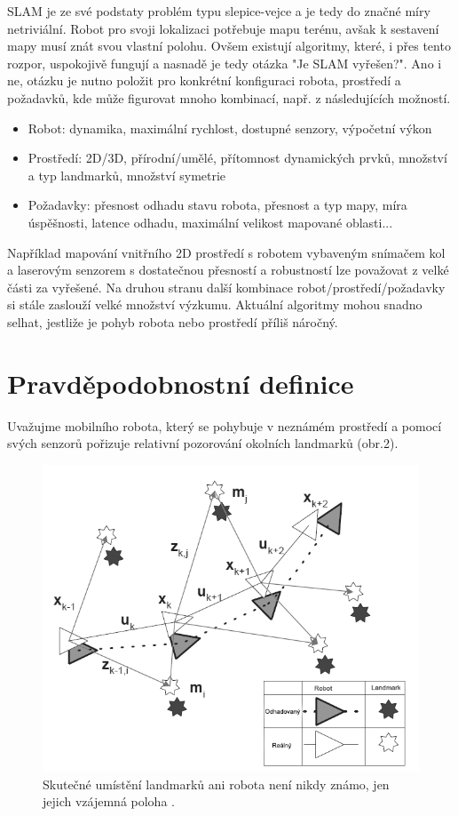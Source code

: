 \documentclass[12pt,a4paper]{report}
\begin{document}
SLAM je ze své podstaty problém typu slepice-vejce a je tedy do značné míry netriviální. Robot pro svoji lokalizaci potřebuje mapu terénu, avšak k sestavení mapy musí znát svou vlastní polohu. Ovšem existují algoritmy, které, i přes tento rozpor, uspokojivě fungují a nasnadě je tedy otázka "Je SLAM vyřešen?". Ano i ne, otázku je nutno položit pro konkrétní konfiguraci robota, prostředí a požadavků, kde může figurovat mnoho kombinací, např. z následujících možností.
\begin{itemize}
\item Robot: dynamika, maximální rychlost, dostupné senzory, výpočetní výkon
\item Prostředí: 2D/3D, přírodní/umělé, přítomnost dynamických prvků, množství a typ landmarků, množství symetrie
\item Požadavky: přesnost odhadu stavu robota, přesnost a typ mapy, míra úspěšnosti, latence odhadu, maximální velikost mapované oblasti...
\end{itemize}
Například mapování vnitřního 2D prostředí s robotem vybaveným snímačem kol a laserovým senzorem s dostatečnou přesností a robustností lze považovat z velké části za vyřešené. Na druhou stranu další kombinace robot/prostředí/požadavky si stále zaslouží velké množství výzkumu. Aktuální algoritmy mohou snadno selhat, jestliže je pohyb robota nebo prostředí příliš náročný.


\section{Pravděpodobnostní definice}
Uvažujme mobilního robota, který se pohybuje v neznámém prostředí a pomocí svých senzorů pořizuje relativní pozorování okolních landmarků (obr.2).

\begin{figure}[H]
\centering
\includegraphics[scale=0.6]{img/Obr2_b}
\caption{Skutečné umístění landmarků ani robota není nikdy známo, jen jejich vzájemná poloha \cite{Durrant-Whyte}.}
\end{figure}
\end{document}
